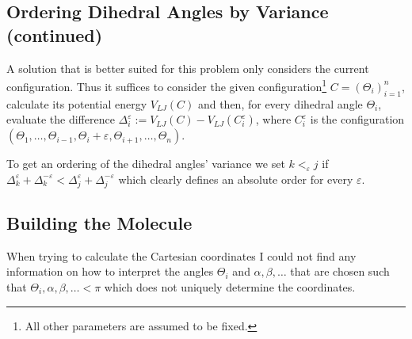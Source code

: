 \subsection{Ordering Dihedral Angles by Variance (continued)}
A solution that is better suited for this problem only considers the current configuration.
Thus it suffices to consider the given configuration\footnote{All other parameters are assumed to be fixed.} $C=(\Theta_i)_{i=1}^n$, calculate its potential energy $V_{LJ}(C)$ and then, for every dihedral angle $\Theta_i$, evaluate the difference $\Delta_i^\varepsilon := V_{LJ}(C) - V_{LJ}(C_i^\varepsilon)$, where $C_i^\varepsilon$ is the configuration $(\Theta_1,\dots,\Theta_{i-1},\Theta_i + \varepsilon,\Theta_{i+1},\dots,\Theta_n)$.

To get an ordering of the dihedral angles' variance we set $k<_\varepsilon j$ if $\Delta_k^\varepsilon + \Delta_k^{-\varepsilon} < \Delta_j^\varepsilon + \Delta_j^{-\varepsilon}$ which clearly defines an absolute order for every $\varepsilon$.

\subsection{Building the Molecule}
When trying to calculate the Cartesian coordinates I could not find any information on how to interpret the angles $\Theta_i$ and $\alpha,\beta,\dots$ that are chosen such that $\Theta_i,\alpha,\beta,\dots < \pi$ which does not uniquely determine the coordinates.
